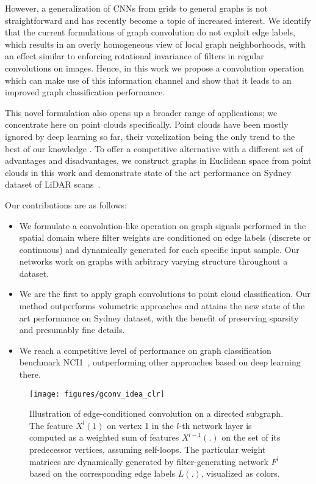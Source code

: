 \documentclass[10pt,twocolumn,letterpaper]{article}
\begin{document}
However, a generalization of CNNs from grids to general graphs is not straightforward and has recently become a topic of increased interest. We identify that the current formulations of graph convolution do not exploit edge labels, which results in an overly homogeneous view of local graph neighborhoods, with an effect similar to enforcing rotational invariance of filters in regular convolutions on images. Hence, in this work we propose a convolution operation which can make use of this information channel and show that it leads to an improved graph classification performance.

This novel formulation also opens up a broader range of applications; we concentrate here on point clouds specifically. Point clouds have been mostly ignored by deep learning so far, their voxelization being the only trend to the best of our knowledge \cite{voxnet,pclabeling16}. To offer a competitive alternative with a different set of advantages and disadvantages, we construct graphs in Euclidean space from point clouds in this work and demonstrate state of the art performance on Sydney dataset of LiDAR scans~\cite{trianglesvm}.

Our contributions are as follows:

\begin{itemize}
\item We formulate a convolution-like operation on graph signals performed in the spatial domain where filter weights are conditioned on edge labels (discrete or continuous) and dynamically generated for each specific input sample. Our networks work on graphs with arbitrary varying structure throughout a dataset.
\item We are the first to apply graph convolutions to point cloud classification. Our method outperforms volumetric approaches and attains the new state of the art performance on Sydney dataset, with the benefit of preserving sparsity and presumably fine details.
\item We reach a competitive level of performance on graph classification benchmark NCI1~\cite{nci1db}, outperforming other approaches based on deep learning there.
\end{itemize}

\begin{figure*}[ht]
\centering
\texttt{[image: figures/gconv\_idea\_clr]}
\vspace{1.5ex}
\caption{\label{fig:gconv} Illustration of edge-conditioned convolution on a directed subgraph. The feature $X^l(1)$ on vertex 1 in the $l$-th network layer is computed as a weighted sum of features $X^{l-1}(.)$ on the set of its predecessor vertices, assuming self-loops. The particular weight matrices are dynamically generated by filter-generating network $F^l$ based on the corresponding edge labels $L(.)$, visualized as colors.}
\end{figure*}
\end{document}
